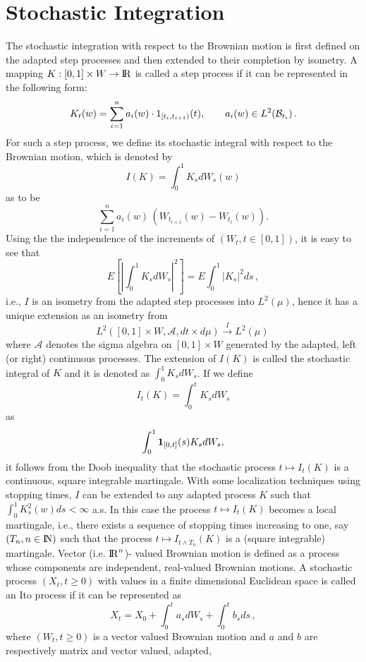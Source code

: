 \documentclass[12pt,a4paper]{book}
\newcommand{\reals}{{\rm I\!R}}
\newcommand{\calB}{{\cal B}}
\newcommand{\R}{{\rm I\!R}}
\newcommand{\N}{{\rm I\!N}}
\newcommand{\won}{{\mbox{\bf 1}}}
\begin{document}
\section{Stochastic Integration}
The stochastic integration with respect to the Brownian motion is
first defined on the adapted step processes and then extended to their
completion by isometry. A mapping  $K: [0,1]\times W\to\R$ is called  a
step process if it can be represented in  the following form:
$$
K_t(w)=\sum_{i=1}^n a_i(w)\cdot1_{[t_i,t_{i+1})}(t),\qquad
a_i(w)\in L^2({\calB}_{t_i})\,.
$$
\noindent
For such a step process, we define  its
stochastic integral with respect to the Brownian motion, which is
denoted by
$$
I(K)=\int_0^1K_s dW_s(w)
$$
as to be
$$
\sum_{i=1}^n
a_i(w)\,\left(W_{t_{i+1}}(w)-W_{t_i}(w)\right).
$$
Using the the independence of the increments of $(W_t,t\in [0,1])$, it
is easy to see that
$$
E\left[\left| \int_0^1 K_sdW_s\right|^2\right]=E\int_0^1
\left|K_s\right|^2ds\,, 
$$
i.e.,  $I$ is an isometry from the adapted step processes into
$L^2(\mu)$, hence it has a unique extension as an isometry from
$$
L^2([0,1]\times W,{\mathcal A},dt\times
d\mu)\stackrel{I}{\longrightarrow} L^2(\mu)\,
$$
where ${\mathcal A}$ denotes the sigma algebra on $[0,1]\times W$
generated by the adapted, left (or right) continuous processes.
\noindent
The extension of $I(K)$ is called the stochastic integral  of $K$ and it is  denoted as
$\int_0^1K_sdW_s$. If we define
$$
I_t(K)=\int_0^t K_s dW_s
$$
as
$$
\int_0^1 \won_{[0,t]}(s)K_s dW_s,
$$
it follows from the Doob inequality  that the stochastic process
$t\mapsto I_t(K)$ is a continuous, square integrable martingale.
 With some localization techniques using stopping times,
$I$ can be extended to any adapted process $K$
such that  $\int_0^1K_s^2(w)ds<\infty$ a.s. In this case the process
 $t\mapsto I_t(K)$ becomes a local martingale, i.e., there exists a sequence
of stopping times increasing to one, say $(T_n,n\in \N)$ such that the
process $t\mapsto I_{t\wedge T_n}(K)$ is a (square integrable)
martingale. Vector (i.e. $\reals^n$)- valued Brownian motion is
defined as a process whose components are independent, real-valued
 Brownian motions. A stochastic process $(X_t,t\geq 0)$ with values in
 a finite dimensional  Euclidean space is called an Ito process if it
 can be represented as 
$$
X_t=X_0+\int_0^t a_sdW_s+\int_0^tb_sds\,,
$$
where $(W_t,t\geq 0)$ is a vector valued Brownian motion and  $a$ and
$b$ are respectively matrix and vector valued, adapted, 
\end{document}
